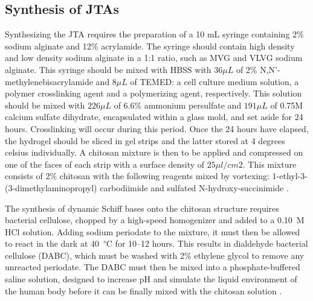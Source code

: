 \subsection{Synthesis of JTAs}
Synthesizing the JTA requires the preparation of a 10 mL syringe containing 2\% sodium alginate and 12\% acrylamide. The syringe should contain high density and low density sodium alginate in a 1:1 ratio, such as MVG and VLVG sodium alginate. This syringe should be mixed with HBSS with $36 \mu L$ of 2\% N,N'-methylenebisacrylamide and $8 \mu L$ of TEMED: a cell culture medium solution, a polymer crosslinking agent and a polymerizing agent, respectively. This solution should be mixed with  $226 \mu L$ of 6.6\% ammonium persulfate and $191 \mu L$ of 0.75M calcium sulfate dihydrate, encapsulated within a glass mold, and set aside for 24 hours. Crosslinking will occur during this period. Once the 24 hours have elapsed, the hydrogel should be sliced in gel strips and the latter stored at 4 degrees celsius individually. A chitosan mixture is then to be applied and compressed on one of the faces of each strip with a surface density of $25 \mu l/cm{2}$. This mixture consists of 2\% chitosan with the following reagents mixed by vortexing: 1-ethyl-3-(3-dimethylaminopropyl) carbodiimide and sulfated N-hydroxy-succinimide \autocite{freedmanEnhancedTendonHealing2022}.

The synthesis of dynamic Schiff bases onto the chitosan structure requires bacterial cellulose, chopped by a high-speed homogenizer and added to a 0.10~M HCl solution. Adding sodium periodate to the mixture, it must then be allowed to react in the dark at 40~\textsuperscript{$\circ$}C for 10--12 hours.
This results in dialdehyde bacterial cellulose (DABC), which must be washed with 2\% ethylene glycol to remove any unreacted periodate. The DABC must then be mixed into a phosphate-buffered saline solution, designed to increase pH and simulate the liquid environment of the human body before it can be finally mixed with the chitosan solution \autocite{liAllnaturalInjectableHydrogel2020}.